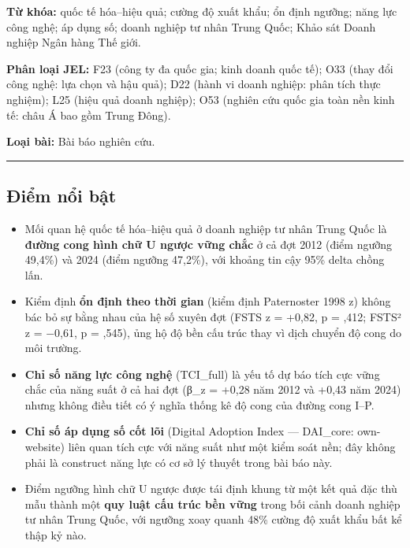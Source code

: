 \documentclass[12pt,a4paper]{article}
\begin{document}
\textbf{Từ khóa:} quốc tế hóa--hiệu quả; cường độ xuất khẩu; ổn định
ngưỡng; năng lực công nghệ; áp dụng số; doanh nghiệp tư nhân Trung Quốc;
Khảo sát Doanh nghiệp Ngân hàng Thế giới.

\textbf{Phân loại JEL:} F23 (công ty đa quốc gia; kinh doanh quốc tế);
O33 (thay đổi công nghệ: lựa chọn và hậu quả); D22 (hành vi doanh
nghiệp: phân tích thực nghiệm); L25 (hiệu quả doanh nghiệp); O53 (nghiên
cứu quốc gia toàn nền kinh tế: châu Á bao gồm Trung Đông).

\textbf{Loại bài:} Bài báo nghiên cứu.

\begin{center}\rule{0.5\linewidth}{0.5pt}\end{center}

\hypertarget{ux111iux1ec3m-nux1ed5i-bux1eadt}{%
\subsection{Điểm nổi bật}\label{ux111iux1ec3m-nux1ed5i-bux1eadt}}

\begin{itemize}
\item
  Mối quan hệ quốc tế hóa--hiệu quả ở doanh nghiệp tư nhân Trung Quốc là
  \textbf{đường cong hình chữ U ngược vững chắc} ở cả đợt 2012 (điểm
  ngưỡng 49,4\%) và 2024 (điểm ngưỡng 47,2\%), với khoảng tin cậy 95\%
  delta chồng lấn.
\item
  Kiểm định \textbf{ổn định theo thời gian} (kiểm định Paternoster 1998
  z) không bác bỏ sự bằng nhau của hệ số xuyên đợt (FSTS z = +0,82, p =
  ,412; FSTS² z = −0,61, p = ,545), ủng hộ độ bền cấu trúc thay vì dịch
  chuyển độ cong do môi trường.
\item
  \textbf{Chỉ số năng lực công nghệ} (TCI\_full) là yếu tố dự báo tích
  cực vững chắc của năng suất ở cả hai đợt (β\_z = +0,28 năm 2012 và
  +0,43 năm 2024) nhưng không điều tiết có ý nghĩa thống kê độ cong của
  đường cong I--P.
\item
  \textbf{Chỉ số áp dụng số cốt lõi} (Digital Adoption Index ---
  DAI\_core: own-website) liên quan tích cực với năng suất như một kiểm
  soát nền; đây không phải là construct năng lực có cơ sở lý thuyết
  trong bài báo này.
\item
  Điểm ngưỡng hình chữ U ngược được tái định khung từ một kết quả đặc
  thù mẫu thành một \textbf{quy luật cấu trúc bền vững} trong bối cảnh
  doanh nghiệp tư nhân Trung Quốc, với ngưỡng xoay quanh 48\% cường độ
  xuất khẩu bất kể thập kỷ nào.
\end{itemize}
\end{document}
